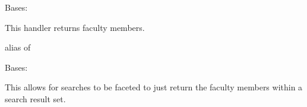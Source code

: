 \documentclass[letterpaper,10pt,english]{sphinxmanual}
\begin{document}

\begin{fulllineitems}
\label{generated/apps.profiles.handlers:apps.profiles.handlers.FacultyHandler}
Bases: 

This handler returns faculty members.


\begin{fulllineitems}
\label{generated/apps.profiles.handlers:apps.profiles.handlers.FacultyHandler.model}
alias of 

\end{fulllineitems}



\begin{fulllineitems}
\label{generated/apps.profiles.handlers:apps.profiles.handlers.FacultyHandler.queryset}
\end{fulllineitems}


\end{fulllineitems}



\begin{fulllineitems}
\label{generated/apps.profiles.handlers:apps.profiles.handlers.FacultyResultHandler}
Bases: {\hyperref[generated/apps.profiles.handlers:apps.profiles.handlers.ResultHandler]{}}

This  allows for searches to be faceted to just return the faculty
members within a search result set.


\begin{fulllineitems}
\label{generated/apps.profiles.handlers:apps.profiles.handlers.FacultyResultHandler.read}
\end{fulllineitems}


\end{fulllineitems}
\end{document}

